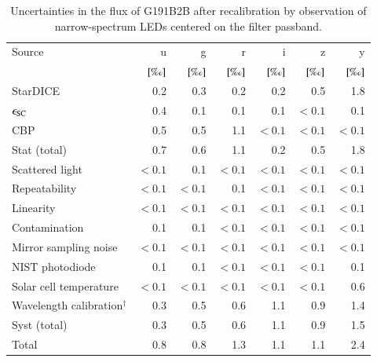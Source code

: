 \begin{table}
  \centering
  \caption{Uncertainties in the flux of G191B2B after recalibration by observation of narrow-spectrum LEDs centered on the filter passband.}
  \label{tab:led}
  \begin{tabular}{@{}l@{}r@{}r@{}r@{}r@{}r@{}r@{}}
    \toprule
    Source & u & g & r & i & z & y \\
           & $[\text{\textperthousand}]$ & $[\text{\textperthousand}]$ & $[\text{\textperthousand}]$ & $[\text{\textperthousand}]$ & $[\text{\textperthousand}]$ & $[\text{\textperthousand}]$\\
    \midrule
    StarDICE & 0.2 & 0.3 & 0.2 & 0.2 & 0.5 & 1.8 \\
    $\epsilon_{\mathrm{SC}}$ & 0.4 & 0.1 & 0.1 & 0.1 & $<0.1$ & 0.1 \\
    CBP & 0.5 & 0.5 & 1.1 & $<0.1$ & $<0.1$ & $<0.1$ \\
    \midrule
    Stat (total) & 0.7 & 0.6 & 1.1 & 0.2 & 0.5 & 1.8 \\
    \midrule
    Scattered light & $<0.1$ & 0.1 & $<0.1$ & $<0.1$ & $<0.1$ & $<0.1$ \\
    Repeatability & $<0.1$ & $<0.1$ & 0.1 & $<0.1$ & $<0.1$ & $<0.1$ \\
    Linearity & $<0.1$ & $<0.1$ & $<0.1$ & $<0.1$ & $<0.1$ & $<0.1$ \\
    Contamination & 0.1 & 0.1 & $<0.1$ & $<0.1$ & $<0.1$ & $<0.1$ \\
    Mirror sampling noise & $<0.1$ & $<0.1$ & $<0.1$ & $<0.1$ & $<0.1$ & $<0.1$ \\
    NIST photodiode & 0.1 & 0.1 & $<0.1$ & $<0.1$ & $<0.1$ & 0.1 \\
    Solar cell temperature & $<0.1$ & $<0.1$ & $<0.1$ & $<0.1$ & $<0.1$ & 0.6 \\
    Wavelength calibration$^\dag$ & 0.3 & 0.5 & 0.6 & 1.1 & 0.9 & 1.4 \\
    \midrule
    Syst (total) & 0.3 & 0.5 & 0.6 & 1.1 & 0.9 & 1.5 \\
    \midrule
    Total & 0.8 & 0.8 & 1.3 & 1.1 & 1.1 & 2.4 \\
    \bottomrule
  \end{tabular}
  
\end{table}



